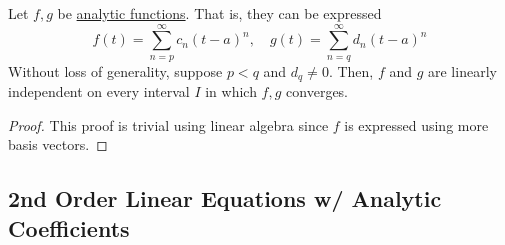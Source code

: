 \documentclass{article}
\begin{document}
    \begin{lemma}
      \label{thm:products-and-quotients-of-analytic-functions}
    Let $f, g$ be \hyperref[real-def:analytic-functions]{analytic functions}. That is, they can be expressed
    \begin{equation}
      f(t) = \sum_{n=p}^\infty c_n (t-a)^n, \quad g(t) = \sum_{n=q}^\infty d_n (t-a)^n
    \end{equation}
    Without loss of generality, suppose $p < q$ and $d_q \neq 0$. Then, $f$ and $g$ are linearly independent on every interval $I$ in which $f, g$ converges. 
    \end{lemma}
    \begin{proof}
    This proof is trivial using linear algebra since $f$ is expressed using more basis vectors. 
    \end{proof}

  \subsection{2nd Order Linear Equations w/ Analytic Coefficients}
\end{document}
